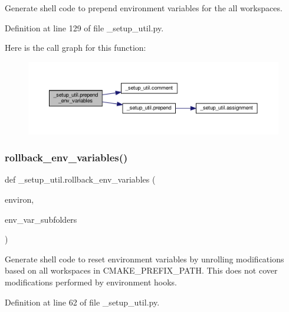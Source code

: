 \begin{DoxyVerb}Generate shell code to prepend environment variables
for the all workspaces.
\end{DoxyVerb}
 

Definition at line 129 of file \+\_\+setup\+\_\+util.\+py.

Here is the call graph for this function\+:
\nopagebreak
\begin{figure}[H]
\begin{center}
\leavevmode
\includegraphics[width=350pt]{namespace__setup__util_a832417d18b85bd1d276a87547e86f860_cgraph}
\end{center}
\end{figure}
\mbox{\label{namespace__setup__util_af3030db6102b5aa35cd354a2fb6cca03}} 
\subsubsection{\texorpdfstring{rollback\+\_\+env\+\_\+variables()}{rollback\_env\_variables()}}
{\footnotesize\ttfamily def \+\_\+setup\+\_\+util.\+rollback\+\_\+env\+\_\+variables (\begin{DoxyParamCaption}\item[{}]{environ,  }\item[{}]{env\+\_\+var\+\_\+subfolders }\end{DoxyParamCaption})}

\begin{DoxyVerb}Generate shell code to reset environment variables
by unrolling modifications based on all workspaces in CMAKE_PREFIX_PATH.
This does not cover modifications performed by environment hooks.
\end{DoxyVerb}
 

Definition at line 62 of file \+\_\+setup\+\_\+util.\+py.


